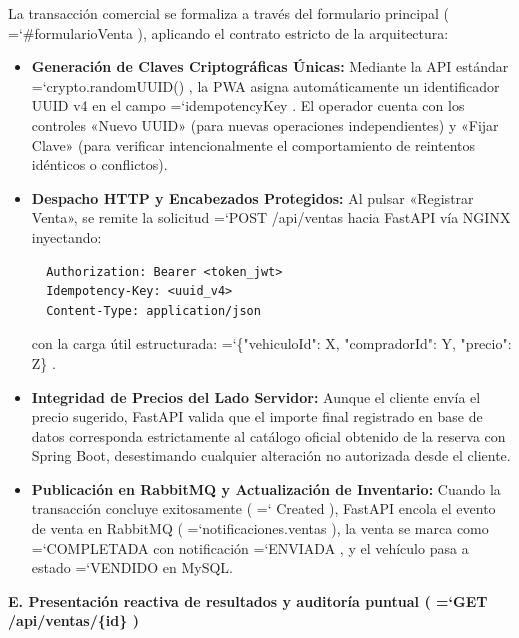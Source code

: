 \documentclass[11pt,a4paper]{article}
\renewcommand{\_}{\oldunderscore\allowbreak}
\DeclareRobustCommand{\texttt}[1]{%
  {\upshape\ttfamily\fontsize{9}{10.8}\selectfont\hyphenchar\font=`\-\relax #1}%
}
\begin{document}
\noindent La transacción comercial se formaliza a través del formulario principal (\texttt{\#formularioVenta}), aplicando el contrato estricto de la arquitectura:
\begin{itemize}[leftmargin=*,itemsep=2pt,topsep=1pt]
  \item \textbf{Generación de Claves Criptográficas Únicas:} Mediante la API estándar \texttt{crypto.\allowbreak{}randomUUID()}, la PWA asigna automáticamente un identificador UUID v4 en el campo \texttt{idempotencyKey}. El operador cuenta con los controles «Nuevo UUID» (para nuevas operaciones independientes) y «Fijar Clave» (para verificar intencionalmente el comportamiento de reintentos idénticos o conflictos).
  \item \textbf{Despacho HTTP y Encabezados Protegidos:} Al pulsar «Registrar Venta», se remite la solicitud \texttt{POST /\allowbreak{}api/\allowbreak{}ventas} hacia FastAPI vía NGINX inyectando:
  {\small
  \begin{lstlisting}
  Authorization: Bearer <token_jwt>
  Idempotency-Key: <uuid_v4>
  Content-Type: application/json
  \end{lstlisting}
  }
  con la carga útil estructurada: \texttt{\{"vehiculoId": X, "compradorId": Y, "precio": Z\}}.
  \item \textbf{Integridad de Precios del Lado Servidor:} Aunque el cliente envía el precio sugerido, FastAPI valida que el importe final registrado en base de datos corresponda estrictamente al catálogo oficial obtenido de la reserva con Spring Boot, desestimando cualquier alteración no autorizada desde el cliente.
  \item \textbf{Publicación en RabbitMQ y Actualización de Inventario:} Cuando la transacción concluye exitosamente (\texttt{201 Created}), FastAPI encola el evento de venta en RabbitMQ (\texttt{notificaciones.\allowbreak{}ventas}), la venta se marca como \texttt{COMPLETADA} con notificación \texttt{ENVIADA}, y el vehículo pasa a estado \texttt{VENDIDO} en MySQL.
\end{itemize}

\vspace{0.2cm}
\noindent\textbf{E. Presentación reactiva de resultados y auditoría puntual (\texttt{GET /\allowbreak{}api/\allowbreak{}ventas/\allowbreak{}\{id\}})}
\end{document}
